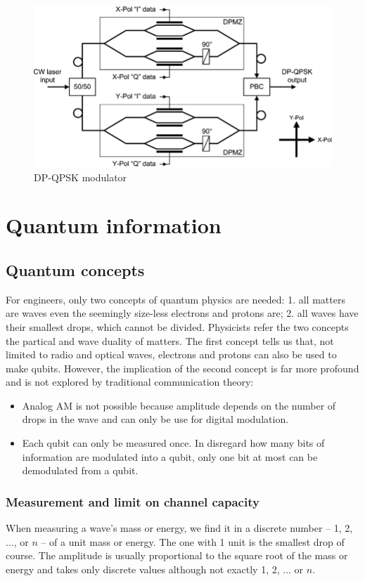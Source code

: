 \documentclass{book}
\begin{document}
\begin{figure}[h]
\includegraphics[width=12cm]{pic/DP-QPSK-modulator.png}
\caption{DP-QPSK modulator}
\label{DP-QPSK}
\end{figure}

\chapter{Quantum information}\label{C-qi}
\section{Quantum concepts}
For engineers, only two concepts of quantum physics are needed: 1. all matters are waves even the seemingly size-less electrons and protons are; 2. all waves have their smallest drops, which cannot be divided. Physicists refer the two concepts the partical and wave duality of matters. The first concept tells us that, not limited to radio and optical waves, electrons and protons can also be used to make qubits. However, the implication of the second concept is far more profound and is not explored by traditional communication theory:

\begin{itemize}
    \item Analog AM is not possible because amplitude depends on the number of drops in the wave and can only be use for digital modulation. 
    \item Each qubit can only be measured once. In disregard how many bits of information are modulated into a qubit, only one bit at most can be demodulated from a qubit.
\end{itemize}

\subsection{Measurement and limit on channel capacity}
When measuring a wave's mass or energy, we find it in a discrete number -- 1, 2, ..., or $n$ -- of a unit mass or energy. The one with 1 unit is the smallest drop of course. The amplitude is usually proportional to the square root of the mass or energy and takes only discrete values although not exactly 1, 2, ... or $n$.
\end{document}
